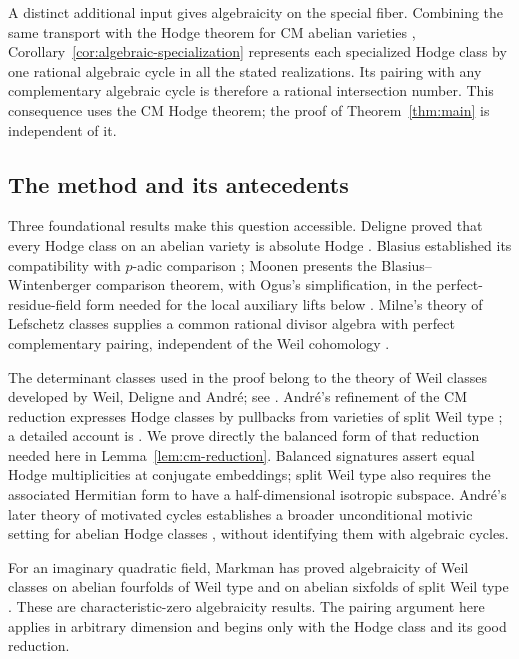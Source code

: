 A distinct additional input gives algebraicity on the special fiber.
Combining the same transport with the Hodge theorem for CM abelian
varieties \cite[Theorem~1.1]{OpenAICMHodge2026},
Corollary~\ref{cor:algebraic-specialization} represents each specialized
Hodge class by one rational algebraic cycle in all the stated
realizations. Its pairing with any complementary algebraic cycle is
therefore a rational intersection number. This consequence uses the CM
Hodge theorem; the proof of Theorem~\ref{thm:main} is independent of it.

\subsection{The method and its antecedents}

Three foundational results make this question accessible. Deligne proved
that every Hodge class on an abelian variety is absolute Hodge
\cite[Main Theorem~2.11]{Deligne1982}. Blasius established its compatibility
with \(p\)-adic comparison \cite[Theorems~0.3 and~5.3]{Blasius1994};
Moonen presents the Blasius--Wintenberger comparison theorem, with
Ogus's simplification, in the perfect-residue-field form needed for
the local auxiliary lifts below \cite[Theorem~5.6.3]{Moonen1998}. Milne's theory of
Lefschetz classes supplies a common rational divisor algebra with perfect
complementary pairing, independent of the Weil cohomology
\cite[Section~5]{Milne1999}.

The determinant classes used in the proof belong to the theory of Weil
classes developed by Weil, Deligne and Andr\'e; see
\cite[Section~4 and Endnotes~M.10--M.12]{Deligne1982}.
Andr\'e's refinement of the CM reduction expresses Hodge classes by
pullbacks from varieties of split Weil type \cite{Andre1992}; a detailed
account is \cite[Theorem~1]{Milne2020}. We prove directly the balanced
form of that reduction needed here in Lemma~\ref{lem:cm-reduction}.
Balanced signatures assert equal Hodge multiplicities at conjugate
embeddings; split Weil type also requires the associated Hermitian
form to have a half-dimensional isotropic subspace.
Andr\'e's later theory of motivated cycles establishes a broader
unconditional motivic setting for abelian Hodge classes
\cite[Theorem~0.6.2]{Andre1996}, without identifying them with algebraic
cycles.

For an imaginary quadratic field, Markman has proved algebraicity of
Weil classes on abelian fourfolds of Weil type and on abelian sixfolds
of split Weil type \cite[Theorem~1.2]{Markman2026}. These are
characteristic-zero algebraicity results. The pairing argument here
applies in arbitrary dimension and begins only with the Hodge class
and its good reduction.

